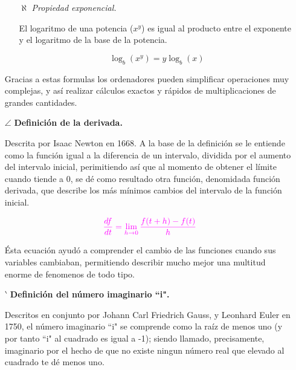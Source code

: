 \documentclass[12pt,letterpaper]{article}
\begin{document}
\begin{itemize}
\begin{itemize}
            \item[$\aleph$] \textit{Propiedad exponencial.}\newline
    
            El logaritmo de una potencia ($x^{y}$) es igual al producto entre el exponente y el logaritmo de la base de la potencia.
            
            $$\log_{b}(x^{y})=y\log_{b}(x)$$
            
        \end{itemize}

    Gracias a estas formulas los ordenadores pueden simplificar operaciones muy complejas, y así realizar cálculos exactos y rápidos de multiplicaciones de grandes cantidades.\newline

    \item[$\angle$] \textbf{Definición de la derivada.}\newline
    
    Descrita por Isaac Newton en 1668. A la base de la definición se le entiende como la función igual a la diferencia de un intervalo, dividida por el aumento del intervalo inicial, perimitiendo así que al momento de obtener el límite cuando tiende a 0, se dé como resultado otra función, denomidada función derivada, que describe los más mínimos cambios del intervalo de la función inicial.\newline

    \begin{equation*}
    \textcolor{Magenta1}{\frac{df}{dt}=\lim_{h\rightarrow 0}\frac{f(t+h)-f(t)}{h}}
    \end{equation*}\newline

    Ésta ecuación ayudó a comprender el cambio de las funciones cuando sus variables cambiaban, permitiendo describir mucho mejor una multitud enorme de fenomenos de todo tipo.\newline
    
    \item[$\backprime$] \textbf{Definición del número imaginario ``i".}\newline
    
    Descritos en conjunto por Johann Carl Friedrich Gauss, y Leonhard Euler en 1750, el número imaginario ``i" se comprende como la raíz de menos uno (y por tanto ``i" al cuadrado es igual a -1); siendo llamado, precisamente, imaginario por el hecho de que no existe ningun número real que elevado al cuadrado te dé menos uno.


\end{itemize}
\end{document}
